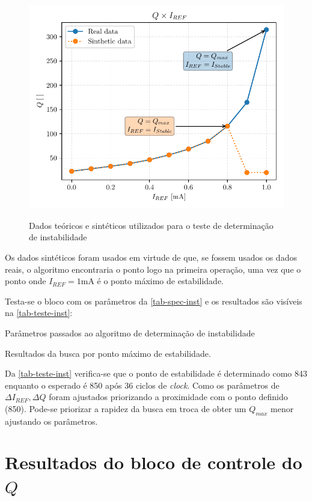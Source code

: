 \begin{figure}[H]
    \centering
    \caption{Dados teóricos e sintéticos utilizados para o teste de determinação de instabilidade}
    \includegraphics[width=.5\textwidth]{fig/q-iref-instability-test.pdf}
    \label{f-inst-test}
\end{figure}

Os dados sintéticos foram usados em virtude de que, se fossem usados os dados reais, o algoritmo encontraria o ponto logo na primeira operação, uma vez que o ponto onde $I_{REF} = 1$mA é o ponto máximo de estabilidade. 


Testa-se o bloco com os parâmetros da \autoref{tab-spec-inst} e os resultados são visíveis na \autoref{tab-teste-inst}:

\begin{table}[H]
    \centering
    \caption{Parâmetros passados ao algoritmo de determinação de instabilidade}
    
    \label{tab-spec-inst}
\end{table}

\begin{table}[H]
    \centering
    \caption{Resultados da busca por ponto máximo de estabilidade.}
    
    \label{tab-teste-inst}
\end{table}

Da \autoref{tab-teste-inst} verifica-se que o ponto de estabilidade é determinado como 843 enquanto o esperado é 850 após 
36 ciclos de \textit{clock}. Como os parâmetros de $\Delta I_{REF}, \Delta Q$ foram ajustados priorizando a proximidade com o ponto definido (850). Pode-se priorizar a rapidez da busca em troca de obter um $Q_{max}$ menor ajustando os parâmetros.


\section{Resultados do bloco de controle do $Q$}

